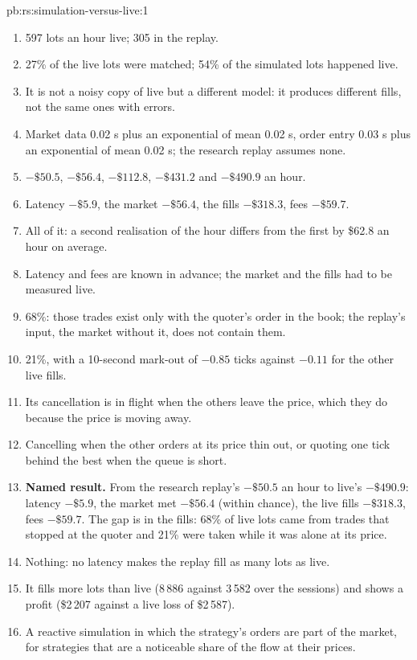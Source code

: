 \begin{solution}{pb:rs:simulation-versus-live:1}
\begin{enumerate}
\item 597 lots an hour live; 305 in the replay.
\item 27\% of the live lots were matched; 54\% of the simulated lots happened live.
\item It is not a noisy copy of live but a different model: it produces different fills, not the same ones with errors.
\item Market data 0.02 s plus an exponential of mean 0.02 s, order entry 0.03 s plus an exponential of mean 0.02 s; the research replay assumes none.
\item $-\$50.5$, $-\$56.4$, $-\$112.8$, $-\$431.2$ and $-\$490.9$ an hour.
\item Latency $-\$5.9$, the market $-\$56.4$, the fills $-\$318.3$, fees $-\$59.7$.
\item All of it: a second realisation of the hour differs from the first by \$62.8 an hour on average.
\item Latency and fees are known in advance; the market and the fills had to be measured live.
\item 68\%: those trades exist only with the quoter's order in the book; the replay's input, the market without it, does not contain them.
\item 21\%, with a 10-second mark-out of $-0.85$ ticks against $-0.11$ for the other live fills.
\item Its cancellation is in flight when the others leave the price, which they do because the price is moving away.
\item Cancelling when the other orders at its price thin out, or quoting one tick behind the best when the queue is short.
\item \textbf{Named result.} From the research replay's $-\$50.5$ an hour to live's $-\$490.9$: latency $-\$5.9$, the market met $-\$56.4$ (within chance), the live fills
$-\$318.3$, fees $-\$59.7$. The gap is in the fills: 68\% of live lots came from trades that stopped at the quoter and 21\% were taken while it was alone at its price.
\item Nothing: no latency makes the replay fill as many lots as live.
\item It fills more lots than live (8\,886 against 3\,582 over the sessions) and shows a profit (\$2\,207 against a live loss of \$2\,587).
\item A reactive simulation in which the strategy's orders are part of the market, for strategies that are a noticeable share of the flow at their prices.

\end{enumerate}
\end{solution}
